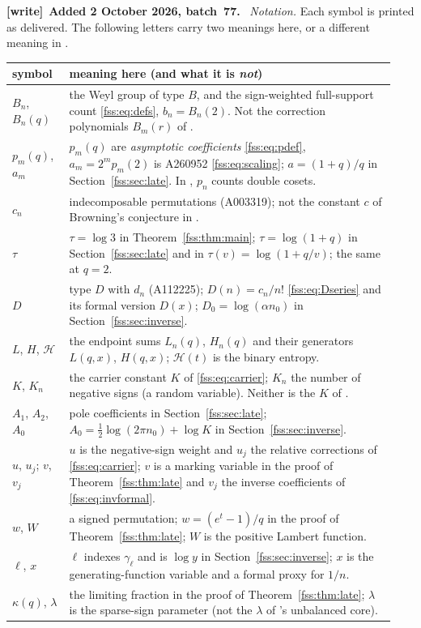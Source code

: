 \documentclass[11pt]{article}
\newenvironment{writenote}[1][]{\par\smallskip\begingroup\small
 \noindent\textbf{[write]}\if\relax\detokenize{#1}\relax\else~\textbf{#1.}\fi\ }%
 {\par\endgroup\smallskip}
\begin{document}
\begin{writenote}[Added 2 October 2026, batch~77]
\emph{Notation.} Each symbol is printed as delivered. The following letters
carry two meanings here, or a different meaning in \cite{fss-pdc}.
\begin{center}\footnotesize
\begin{tabular}{@{}p{0.14\linewidth}p{0.80\linewidth}@{}}
\toprule
symbol & meaning here (and what it is \emph{not})\\
\midrule
$B_n$, $B_n(q)$ & the Weyl group of type $B$, and the sign-weighted full-support count \eqref{fss:eq:defs}, $b_n=B_n(2)$. Not the correction polynomials $B_m(r)$ of \cite{fss-pdc}.\\
$p_m(q)$, $a_m$ & $p_m(q)$ are \emph{asymptotic coefficients} \eqref{fss:eq:pdef}, $a_m=2^mp_m(2)$ is A260952 \eqref{fss:eq:scaling}; $a=(1+q)/q$ in Section~\ref{fss:sec:late}. In \cite{fss-pdc}, $p_n$ counts double cosets.\\
$c_n$ & indecomposable permutations (A003319); not the constant $c$ of Browning's conjecture in \cite{fss-pdc}.\\
$\tau$ & $\tau=\log3$ in Theorem~\ref{fss:thm:main}; $\tau=\log(1+q)$ in Section~\ref{fss:sec:late} and in $\tau(v)=\log(1+q/v)$; the same at $q=2$.\\
$D$ & type $D$ with $d_n$ (A112225); $D(n)=c_n/n!$ \eqref{fss:eq:Dseries} and its formal version $D(x)$; $D_0=\log(\alpha n_0)$ in Section~\ref{fss:sec:inverse}.\\
$L$, $H$, $\mathcal H$ & the endpoint sums $L_n(q)$, $H_n(q)$ and their generators $L(q,x)$, $H(q,x)$; $\mathcal H(t)$ is the binary entropy.\\
$K$, $K_n$ & the carrier constant $K$ of \eqref{fss:eq:carrier}; $K_n$ the number of negative signs (a random variable). Neither is the $K$ of \cite{fss-pdc}.\\
$A_1$, $A_2$, $A_0$ & pole coefficients in Section~\ref{fss:sec:late}; $A_0=\tfrac12\log(2\pi n_0)+\log K$ in Section~\ref{fss:sec:inverse}.\\
$u$, $u_j$; $v$, $v_j$ & $u$ is the negative-sign weight and $u_j$ the relative corrections of \eqref{fss:eq:carrier}; $v$ is a marking variable in the proof of Theorem~\ref{fss:thm:late} and $v_j$ the inverse coefficients of \eqref{fss:eq:invformal}.\\
$w$, $W$ & a signed permutation; $w=(e^t-1)/q$ in the proof of Theorem~\ref{fss:thm:late}; $W$ is the positive Lambert function.\\
$\ell$, $x$ & $\ell$ indexes $\gamma_\ell$ and is $\log y$ in Section~\ref{fss:sec:inverse}; $x$ is the generating-function variable and a formal proxy for $1/n$.\\
$\kappa(q)$, $\lambda$ & the limiting fraction in the proof of Theorem~\ref{fss:thm:late}; $\lambda$ is the sparse-sign parameter (not the $\lambda$ of \cite{fss-cti}'s unbalanced core).\\
\bottomrule
\end{tabular}
\end{center}
\end{writenote}
\end{document}
